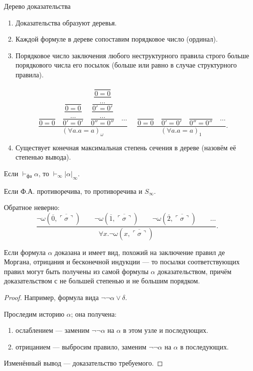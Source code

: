 {Дерево доказательства}
\begin{enumerate}
\item Доказательства образуют деревья.
\item Каждой формуле в дереве сопоставим порядковое число (ординал).
\item Порядковое число заключения любого неструктурного правила строго больше порядкового числа его посылок
(больше или равно в случае структурного правила).

\[ \dfrac{
   \dfrac{}{0 = 0}\quad
   \dfrac{\dfrac{\dfrac{}{0= 0}}{\dots}}{0'= 0'}\quad
   \dfrac{\dfrac{\dfrac{\dfrac{\dfrac{}{0 = 0}}{\dots}}{0'= 0'}}{\dots}}{0''= 0''}\quad\dots
}{(\forall a.a = a)_\omega}~~~~~~
\dfrac{
   \dfrac{}{0 = 0}\quad
   \dfrac{}{0'= 0'}\quad
   \dfrac{}{0''= 0''}\quad\dots
}{(\forall a.a = a)_1}. \]

\item Существует конечная максимальная степень сечения в дереве (назовём её степенью вывода).
\end{enumerate}


\begin{theorem}
  Если $\vdash_\text{фа}\alpha$, то $\vdash_\infty|\alpha|_\infty$.
\end{theorem}
\begin{theorem}
  Если Ф.А. противоречива, то противоречива и $S_\infty$.
\end{theorem}
\begin{example}
  Обратное неверно: \[ \dfrac
{\neg\omega(\overline{0},\overline{\ulcorner\sigma\urcorner})\quad\quad
 \neg\omega(\overline{1},\overline{\ulcorner\sigma\urcorner})\quad\quad
 \neg\omega(\overline{2},\overline{\ulcorner\sigma\urcorner})\quad\quad\dots}{\forall x.\neg\omega(x,\overline{\ulcorner\sigma\urcorner})}.\]
\end{example}


\begin{theorem}
Если формула $\alpha$ доказана и имеет вид, похожий на заключение правил де Моргана,
отрицания и бесконечной индукции --- то посылки соответствующих правил могут быть получены из самой
формулы $\alpha$ доказательством, причём доказательством с не большей степенью и не большим порядком.
\end{theorem}
\begin{proof}
Например, формула вида $\neg\neg \alpha\vee\delta$.

Проследим историю $\alpha$; она получена:
\begin{enumerate}
\item ослаблением --- заменим $\neg\neg\alpha$ на $\alpha$ в этом узле и последующих.
\item отрицанием --- выбросим правило, заменим $\neg\neg\alpha$ на $\alpha$ в последующих.
\end{enumerate}
Изменённый вывод --- доказательство требуемого.
\end{proof}


